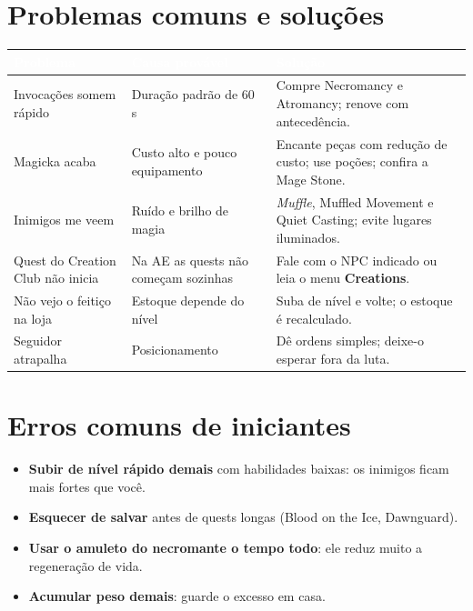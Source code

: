\documentclass[11pt,a4paper,oneside,openany]{book}
\newcommand{\magia}[1]{\textit{\textcolor{SoulCairnPurple}{#1}}}
\newcommand{\perk}[1]{\textsf{\textcolor{SoulCairnPurple}{#1}}}
\newcommand{\cabec}[1]{\textcolor{white}{\sffamily\bfseries\small #1}}
\newcommand{\tabhead}{\rowcolor{NecroEmerald}}
\begin{document}
\section{Problemas comuns e soluções}
\begin{center}
\small
{}
\begin{tabularx}{\linewidth}{@{}L{3.4cm}L{4.0cm}Y@{}}
\tabhead \cabec{Problema} & \cabec{Causa provável} & \cabec{Solução} \\
\toprule
Invocações somem rápido & Duração padrão de 60 s & Compre \perk{Necromancy} e \perk{Atromancy}; renove com antecedência. \\
Magicka acaba & Custo alto e pouco equipamento & Encante peças com redução de custo; use poções; confira a Mage Stone. \\
Inimigos me veem & Ruído e brilho de magia & \magia{Muffle}, \perk{Muffled Movement} e \perk{Quiet Casting}; evite lugares iluminados. \\
Quest do Creation Club não inicia & Na AE as quests não começam sozinhas & Fale com o NPC indicado ou leia o menu \textbf{Creations}. \\
Não vejo o feitiço na loja & Estoque depende do nível & Suba de nível e volte; o estoque é recalculado. \\
Seguidor atrapalha & Posicionamento & Dê ordens simples; deixe-o esperar fora da luta. \\
\bottomrule
\end{tabularx}
\end{center}

\section{Erros comuns de iniciantes}
\begin{itemize}
  \item \textbf{Subir de nível rápido demais} com habilidades baixas: os inimigos ficam mais fortes que você.
  \item \textbf{Esquecer de salvar} antes de quests longas (Blood on the Ice, Dawnguard).
  \item \textbf{Usar o amuleto do necromante o tempo todo}: ele reduz muito a regeneração de vida.
  \item \textbf{Acumular peso demais}: guarde o excesso em casa.
\end{itemize}

\appendix
\end{document}
